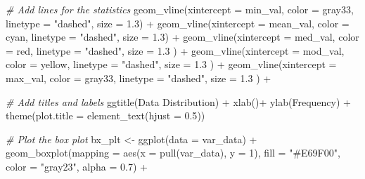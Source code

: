 \documentclass[
]{article}
\newenvironment{Shaded}{\begin{snugshade}}{\end{snugshade}}
\newcommand{\AttributeTok}[1]{\textcolor[rgb]{0.77,0.63,0.00}{#1}}
\newcommand{\CommentTok}[1]{\textcolor[rgb]{0.56,0.35,0.01}{\textit{#1}}}
\newcommand{\DecValTok}[1]{\textcolor[rgb]{0.00,0.00,0.81}{#1}}
\newcommand{\FloatTok}[1]{\textcolor[rgb]{0.00,0.00,0.81}{#1}}
\newcommand{\FunctionTok}[1]{\textcolor[rgb]{0.00,0.00,0.00}{#1}}
\newcommand{\NormalTok}[1]{#1}
\newcommand{\OtherTok}[1]{\textcolor[rgb]{0.56,0.35,0.01}{#1}}
\newcommand{\SpecialCharTok}[1]{\textcolor[rgb]{0.00,0.00,0.00}{#1}}
\newcommand{\StringTok}[1]{\textcolor[rgb]{0.31,0.60,0.02}{#1}}
\begin{document}
\begin{Shaded}
\begin{Highlighting}[]
  \CommentTok{\# Add lines for the statistics}
  \FunctionTok{geom\_vline}\NormalTok{(}\AttributeTok{xintercept =}\NormalTok{ min\_val, }\AttributeTok{color =} \StringTok{\textquotesingle{}gray33\textquotesingle{}}\NormalTok{, }\AttributeTok{linetype =} \StringTok{"dashed"}\NormalTok{, }\AttributeTok{size =} \FloatTok{1.3}\NormalTok{) }\SpecialCharTok{+}
  \FunctionTok{geom\_vline}\NormalTok{(}\AttributeTok{xintercept =}\NormalTok{ mean\_val, }\AttributeTok{color =} \StringTok{\textquotesingle{}cyan\textquotesingle{}}\NormalTok{, }\AttributeTok{linetype =} \StringTok{"dashed"}\NormalTok{, }\AttributeTok{size =} \FloatTok{1.3}\NormalTok{) }\SpecialCharTok{+}
  \FunctionTok{geom\_vline}\NormalTok{(}\AttributeTok{xintercept =}\NormalTok{ med\_val, }\AttributeTok{color =} \StringTok{\textquotesingle{}red\textquotesingle{}}\NormalTok{, }\AttributeTok{linetype =} \StringTok{"dashed"}\NormalTok{, }\AttributeTok{size =} \FloatTok{1.3}\NormalTok{ ) }\SpecialCharTok{+}
  \FunctionTok{geom\_vline}\NormalTok{(}\AttributeTok{xintercept =}\NormalTok{ mod\_val, }\AttributeTok{color =} \StringTok{\textquotesingle{}yellow\textquotesingle{}}\NormalTok{, }\AttributeTok{linetype =} \StringTok{"dashed"}\NormalTok{, }\AttributeTok{size =} \FloatTok{1.3}\NormalTok{ ) }\SpecialCharTok{+}
  \FunctionTok{geom\_vline}\NormalTok{(}\AttributeTok{xintercept =}\NormalTok{ max\_val, }\AttributeTok{color =} \StringTok{\textquotesingle{}gray33\textquotesingle{}}\NormalTok{, }\AttributeTok{linetype =} \StringTok{"dashed"}\NormalTok{, }\AttributeTok{size =} \FloatTok{1.3}\NormalTok{ ) }\SpecialCharTok{+}
    
  \CommentTok{\# Add titles and labels}
  \FunctionTok{ggtitle}\NormalTok{(}\StringTok{\textquotesingle{}Data Distribution\textquotesingle{}}\NormalTok{) }\SpecialCharTok{+}
  \FunctionTok{xlab}\NormalTok{(}\StringTok{\textquotesingle{}\textquotesingle{}}\NormalTok{)}\SpecialCharTok{+}
  \FunctionTok{ylab}\NormalTok{(}\StringTok{\textquotesingle{}Frequency\textquotesingle{}}\NormalTok{) }\SpecialCharTok{+}
  \FunctionTok{theme}\NormalTok{(}\AttributeTok{plot.title =} \FunctionTok{element\_text}\NormalTok{(}\AttributeTok{hjust =} \FloatTok{0.5}\NormalTok{))}
  
  \CommentTok{\# Plot the box plot}
\NormalTok{  bx\_plt }\OtherTok{\textless{}{-}} \FunctionTok{ggplot}\NormalTok{(}\AttributeTok{data =}\NormalTok{ var\_data) }\SpecialCharTok{+}
  \FunctionTok{geom\_boxplot}\NormalTok{(}\AttributeTok{mapping =} \FunctionTok{aes}\NormalTok{(}\AttributeTok{x =} \FunctionTok{pull}\NormalTok{(var\_data), }\AttributeTok{y =} \DecValTok{1}\NormalTok{),}
               \AttributeTok{fill =} \StringTok{"\#E69F00"}\NormalTok{, }\AttributeTok{color =} \StringTok{"gray23"}\NormalTok{, }\AttributeTok{alpha =} \FloatTok{0.7}\NormalTok{) }\SpecialCharTok{+}
    

\end{Highlighting}
\end{Shaded}
\end{document}
